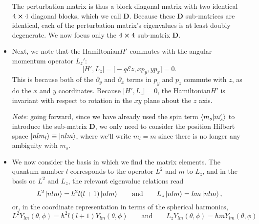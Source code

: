 \documentclass[11pt, a4paper]{article}
\newcommand{\eqtext}[1]{\qquad \text{#1} \qquad}
\newcommand{\Ham}{Hamiltonian\xspace}
\newcommand{\mat}[1]{\mathbf{#1}} %
\newcommand{\E}{\mathcal{E}}  %
\begin{document}
\begin{itemize}
	The perturbation matrix is thus a block diagonal matrix with two identical $ 4 \cross 4 $ diagonal blocks, which we call $ \mat{D} $. Because these $ \mat{D} $ sub-matrices are identical, each of the perturbation matrix's eigenvalues is at least doubly degenerate. We now focus only the $ 4\cross 4 $ sub-matrix $ \mat{D} $. 
	
	\item Next, we note that the \Ham $ H' $ commutes with the angular momentum operator $ L_{z}' $:
	\begin{equation*}
		\big[H', L_{z}\big] = \big[- q \E z, xp_{y}, yp_{x}\big] = 0.
	\end{equation*}
	This is because both of the $ \partial_{y} $ and $ \partial_{x} $ terms in $ p_{y} $ and $ p_{z} $ commute with $ z $, as do the $ x $ and $ y $ coordinates. Because $ \big[H', L_{z}\big] = 0 $, the \Ham $ H' $ is invariant with respect to rotation in the $ xy $ plane about the $ z $ axis. 
	
	\textit{Note}: going forward, since we have already used the spin term $ \braket{m_{s}}{m_{s}'} $ to introduce the sub-matrix $ \mat{D} $, we only need to consider the position Hilbert space $ \ket{nlm_{l}} \equiv \ket{nlm} $, where we'll write $ m_{l} = m $ since there is no longer any ambiguity with $ m_{s} $.
	
	\item We now consider the basis in which we find the matrix elements. The quantum number $ l $ corresponds to the operator $ L^{2} $ and $ m $ to $ L_{z} $, and in the basis oc $ L^{2} $ and $ L_{z} $, the relevant eigenvalue relations read
	\begin{equation*}
		L^{2}\ket{nlm} = \hbar^{2} l (l+1)\ket{nlm} \eqtext{and} L_{z}\ket{nlm} = \hbar m\ket{nlm},
	\end{equation*}
	or, in the coordinate representation in terms of the spherical harmonics,
	\begin{equation*}
		L^{2}Y_{lm}(\theta, \phi) =  \hbar^{2} l (l+1)Y_{lm}(\theta, \phi) \eqtext{and} L_{z}Y_{lm}(\theta, \phi) =  \hbar m Y_{lm}(\theta, \phi)
	\end{equation*}
	

\end{itemize}
\end{document}
